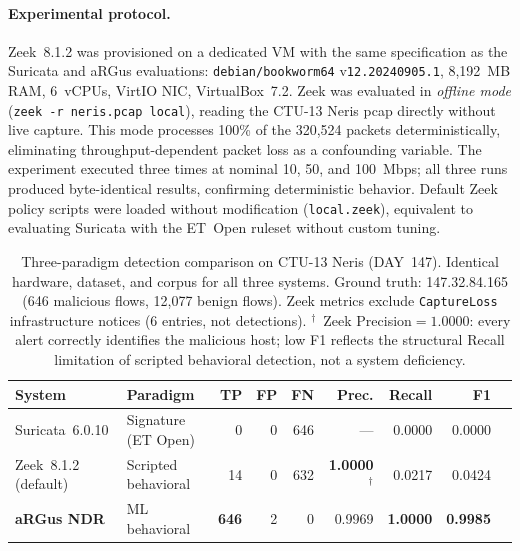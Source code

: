 \documentclass[11pt,a4paper]{article}
\begin{document}
    \paragraph{Experimental protocol.}
    Zeek~8.1.2 was provisioned on a dedicated VM with the same specification as the
    Suricata and aRGus evaluations: \texttt{debian/bookworm64} v\texttt{12.20240905.1},
    8,192~MB RAM, 6~vCPUs, VirtIO NIC, VirtualBox~7.2. Zeek was evaluated in
    \emph{offline mode} (\texttt{zeek -r neris.pcap local}), reading the CTU-13 Neris
    pcap directly without live capture. This mode processes 100\% of the 320,524 packets
    deterministically, eliminating throughput-dependent packet loss as a confounding
    variable. The experiment executed three times at nominal 10, 50, and 100~Mbps; all
    three runs produced byte-identical results, confirming deterministic behavior. Default
    Zeek policy scripts were loaded without modification (\texttt{local.zeek}),
    equivalent to evaluating Suricata with the ET~Open ruleset without custom tuning.

    \begin{table}[h]
        \centering
        \caption{Three-paradigm detection comparison on CTU-13 Neris (DAY~147).
        Identical hardware, dataset, and corpus for all three systems.
        Ground truth: 147.32.84.165 (646 malicious flows, 12,077 benign flows).
        Zeek metrics exclude \texttt{CaptureLoss} infrastructure notices (6 entries,
            not detections). $^{\dagger}$~Zeek Precision$=1.0000$: every alert correctly
            identifies the malicious host; low F1 reflects the structural Recall
            limitation of scripted behavioral detection, not a system deficiency.}
        \label{tab:threeparadigms}
        \begin{tabular}{llrrrrrrr}
            \toprule
            \textbf{System} & \textbf{Paradigm} & \textbf{TP} & \textbf{FP} &
            \textbf{FN} & \textbf{Prec.} & \textbf{Recall} & \textbf{F1} \\
            \midrule
            Suricata~6.0.10      & Signature (ET Open)  & 0   & 0 & 646
            & ---    & 0.0000 & 0.0000 \\
            Zeek~8.1.2 (default) & Scripted behavioral  & 14  & 0 & 632
            & \textbf{1.0000}$^{\dagger}$ & 0.0217 & 0.0424 \\
            \textbf{aRGus NDR}   & ML behavioral        & \textbf{646} & 2 & 0
            & 0.9969 & \textbf{1.0000} & \textbf{0.9985} \\
            \bottomrule
        \end{tabular}
    \end{table}
\end{document}
